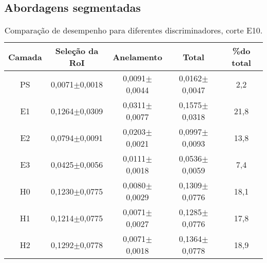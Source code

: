 \subsection{Abordagens segmentadas}

\begin{table}[h!]
\centering \caption{Comparação de desempenho para diferentes
discriminadores, corte E10.}\vspace{0.2cm} \footnotesize
\begin{tabular}{c|c|c|c | c}
    \hline
\textbf{Camada} & \textbf{Seleção da RoI} & \textbf{Anelamento} &
\textbf{Total} & \%\textbf{do total} \\ \hline
PS & 0,0071$\pm$0,0018 & 0,0091$\pm$0,0044 & 0,0162$\pm$0,0047 & 2,2\\
E1 & 0,1264$\pm$0,0309 & 0,0311$\pm$0,0077 & 0,1575$\pm$0,0318 & 21,8\\
E2 & 0,0794$\pm$0,0091 & 0,0203$\pm$0,0021 & 0,0997$\pm$0,0093 & 13,8\\
E3 & 0,0425$\pm$0,0056 & 0,0111$\pm$0,0018 & 0,0536$\pm$0,0059 & 7,4\\
H0 & 0,1230$\pm$0,0775 & 0,0080$\pm$0,0029 & 0,1309$\pm$0,0776 & 18,1\\
H1 & 0,1214$\pm$0,0775 & 0,0071$\pm$0,0027 & 0,1285$\pm$0,0776 & 17,8\\
H2 & 0,1292$\pm$0,0778 & 0,0071$\pm$0,0018 & 0,1364$\pm$0,0778 & 18,9\\
\hline
\end{tabular}
\label{tab_compTimeexpSeg}
\end{table}
